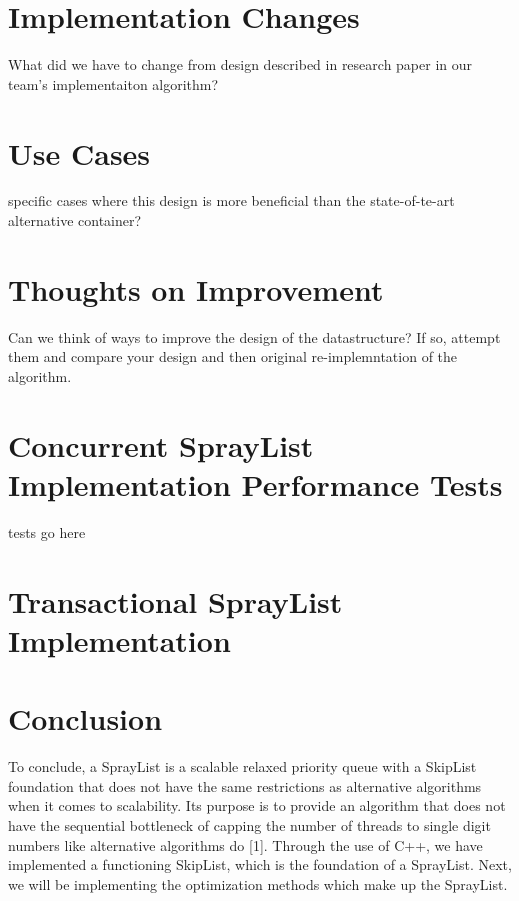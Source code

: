 \documentclass[conference]{IEEEtran}
\begin{document}
\section{Implementation Changes}
What did we have to change from design described in research paper in our team's implementaiton algorithm?

\section{Use Cases}
specific cases where this design is more beneficial than the state-of-te-art alternative container?

\section{Thoughts on Improvement}
Can we think of ways to improve the design of the datastructure? If so, attempt them and compare your design and then original re-implemntation of the algorithm.

\section{Concurrent SprayList Implementation Performance Tests}
tests go here

\section{Transactional SprayList Implementation}

\section{Conclusion}

To conclude, a SprayList is a scalable relaxed priority queue with a SkipList foundation that does not have the same restrictions as alternative algorithms when it comes to scalability.  Its purpose is to provide an algorithm that does not have the sequential bottleneck of capping the number of threads to single digit numbers like alternative algorithms do [1]. Through the use of C++, we have implemented a functioning SkipList, which is the foundation of a SprayList. Next, we will be implementing the optimization methods which make up the SprayList.
\end{document}
